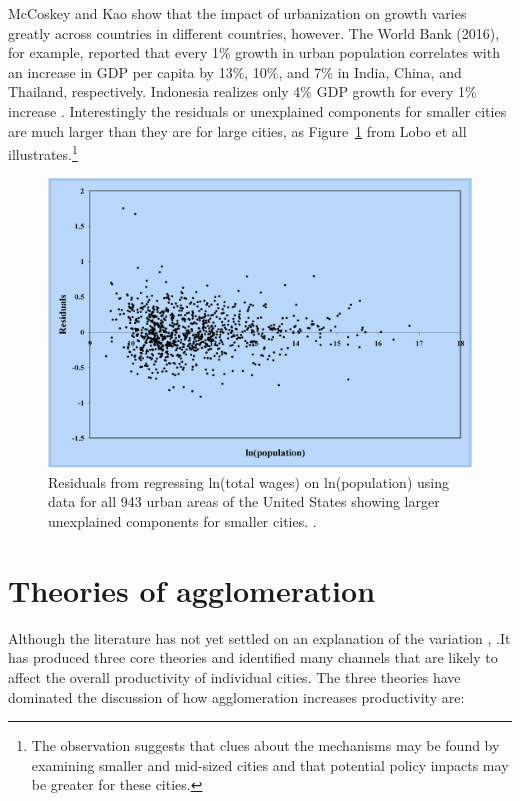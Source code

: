 McCoskey and Kao \cite{mccoskeyPanelDataInvestigation} show that the impact of urbanization on growth varies greatly across countries in different countries, however. The World Bank (2016), for example, reported that every 1\% growth in urban population correlates with an increase in GDP per capita by 13\%, 10\%, and 7\% in India, China, and Thailand, respectively. Indonesia realizes only 4\% GDP growth for every 1\% increase \cite{haryantotriRelationshipUrbanizationEducation2021}. Interestingly the residuals or unexplained components for smaller cities are much larger than they are for large cities, as Figure~\ref{fig-residuals-lobo} from Lobo et all \cite{loboUrbanScalingProduction2013} illustrates.\footnote{The observation suggests that clues about the mechanisms may be found by examining smaller and mid-sized cities and that potential policy impacts may be greater for these cities.}

\begin{figure}[h!tb]
\centering
\includegraphics[scale=0.30]{fig/residuals-lobo.png}
\caption{Residuals from regressing ln(total wages) on ln(population) using data for all 943 urban areas of the United States showing larger unexplained components for smaller cities. \cite{loboUrbanScalingProduction2013}.}
\label{fig-residuals-lobo}
\end{figure}

\section{Theories of agglomeration}
Although the literature has not yet settled on an explanation of the variation \cite{loboUrbanScalingProduction2013}, \cite{pugaMagnitudeCausesAgglomeration2010}.It has produced three core theories and identified many channels that are likely to affect the overall productivity of individual cities. 
The three theories have dominated the discussion of how agglomeration increases productivity are:

